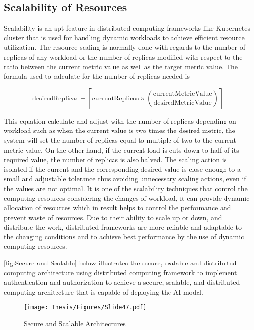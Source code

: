 \subsection{Scalability of Resources}


Scalability is an apt feature in distributed computing frameworks like Kubernetes cluster that is used for handling dynamic workloads to achieve efficient resource utilization. The resource scaling is
normally done with regards to the number of replicas of any workload or the number of replicas modified with respect to the ratio between the current metric value as well as the target metric value. The formula used to calculate for the number of replicas needed is

\[
\text{desiredReplicas} = \left\lceil \text{currentReplicas} \times \left( \frac{\text{currentMetricValue}}{\text{desiredMetricValue}} \right) \right\rceil
\]


This equation calculate and adjust with the number of replicas depending on workload such as when the current value is two times the desired metric, the system will set the number of replicas equal to multiple of two to the current metric value. On the other hand, if the current load is cuts down to half of its required value, the number of replicas is also halved. The scaling action is isolated if the current and the corresponding desired value is close enough to a small and adjustable tolerance thus avoiding unnecessary scaling actions, even if the values are not optimal. It is one of the scalability techniques that control the computing resources considering the changes of workload, it can provide dynamic allocation of resources which in result helps to control the performance and prevent waste of resources. Due to their ability to scale up or down, and distribute the work, distributed frameworks are more reliable and adaptable to the changing conditions and to achieve best performance by the use of dynamic computing resources. \cite{Kubernetes_doc}


\clearpage



\autoref{fig:Secure and Scalable} below illustrates the secure, scalable and distributed computing architecture using
distributed computing framework to implement authentication and authorization to achieve a secure, scalable, and distributed computing architecture that is capable of deploying the AI model.

\begin{figure}[h]
\centering
\texttt{[image: Thesis/Figures/Slide47.pdf]}
\caption{\label{fig:Secure and Scalable}Secure and Scalable Architectures}
\end{figure}

